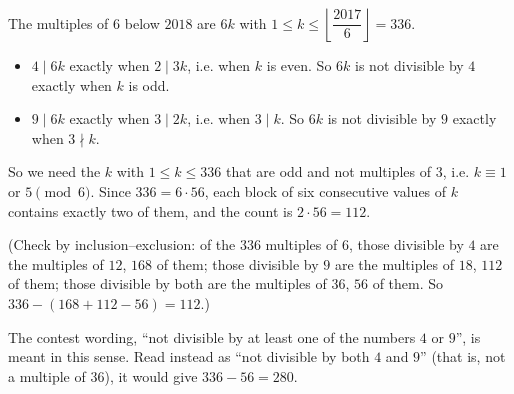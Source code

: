 The multiples of $6$ below $2018$ are $6k$ with $1\le k\le\left\lfloor\dfrac{2017}{6}\right\rfloor=336$.
\begin{itemize}
\item $4\mid6k$ exactly when $2\mid3k$, i.e. when $k$ is even. So $6k$ is not divisible by $4$ exactly when $k$ is odd.
\item $9\mid6k$ exactly when $3\mid2k$, i.e. when $3\mid k$. So $6k$ is not divisible by $9$ exactly when $3\nmid k$.
\end{itemize}
So we need the $k$ with $1\le k\le336$ that are odd and not multiples of $3$, i.e. $k\equiv1$ or $5\pmod6$. Since $336=6\cdot56$, each block of six consecutive values of $k$ contains exactly two of them, and the count is $2\cdot56=\boxed{112}$.

(Check by inclusion--exclusion: of the $336$ multiples of $6$, those divisible by $4$ are the multiples of $12$, $168$ of them; those divisible by $9$ are the multiples of $18$, $112$ of them; those divisible by both are the multiples of $36$, $56$ of them. So $336-(168+112-56)=112$.)

The contest wording, ``not divisible by at least one of the numbers $4$ or $9$'', is meant in this sense. Read instead as ``not divisible by both $4$ and $9$'' (that is, not a multiple of $36$), it would give $336-56=280$.
